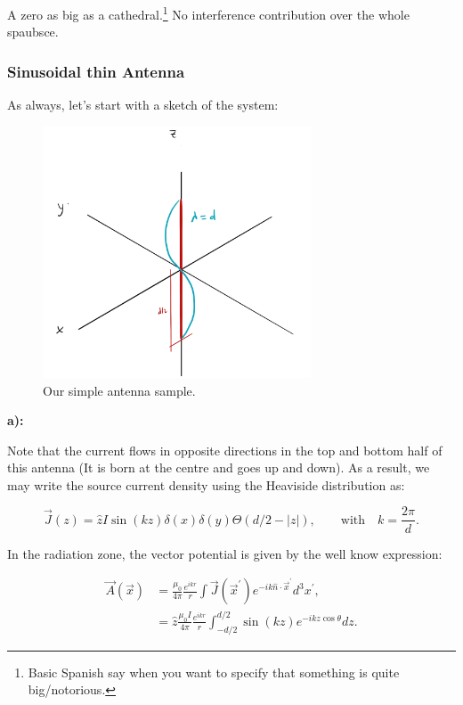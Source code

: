 A zero as big as a cathedral.\footnote{Basic Spanish say when you want to specify that something is quite big/notorious.} No interference contribution over the whole spaubsce.



\subsubsection{Sinusoidal thin Antenna}\label{Sinusoidal thin Antenna}
As always, let's start with a sketch of the system:

\begin{figure}[h]
	\includegraphics[width=8cm]{figures/sinuantenna.png}
	\centering
	\caption{Our simple antenna sample.}
\end{figure}

\textbf{a):}
	
Note that the current flows in opposite directions in the top and bottom half of this antenna (It is born at the centre and goes up and down). As a result, we may write the source current density using the Heaviside distribution as:

\begin{equation}
	\vec{J}(z)=\hat{z} I \sin (k z) \delta(x) \delta(y) \Theta(d / 2-|z|), \quad \quad \text{with}\quad  k=\frac{2 \pi}{d}.
\end{equation}

In the radiation zone, the vector potential is given by the well know expression:

\begin{equation}
	\begin{split}
		\vec{A}(\vec{x}) &=\frac{\mu_{0}}{4 \pi} \frac{e^{i k r}}{r} \int \vec{J}\left(\vec{x}^{\prime}\right) e^{-i k \hat{n} \cdot \vec{x}^{\prime}} d^{3} x^{\prime},\\
		&=\hat{z} \frac{\mu_{0} I}{4 \pi} \frac{e^{i k r}}{r} \int_{-d / 2}^{d / 2} \sin (k z) e^{-i k z \cos \theta} d z.
	\end{split}
\end{equation}

